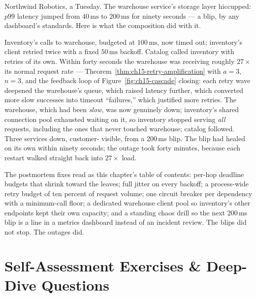 Northwind Robotics, a Tuesday. The warehouse service's storage layer
hiccupped: $p99$ latency jumped from $40\,\mathrm{ms}$ to
$200\,\mathrm{ms}$ for ninety seconds --- a blip, by any dashboard's
standards. Here is what the composition did with it.

Inventory's calls to warehouse, budgeted at $100\,\mathrm{ms}$, now timed
out; inventory's client retried twice with a fixed $50\,\mathrm{ms}$
backoff. Catalog called inventory with retries of its own. Within forty
seconds the warehouse was receiving roughly $27\times$ its normal request
rate --- Theorem~\ref{thm:ch15-retry-amplification} with $a = 3$, $n = 3$,
and the feedback loop of Figure~\ref{fig:ch15-cascade} closing: each retry
wave deepened the warehouse's queue, which raised latency further, which
converted more slow successes into timeout ``failures,'' which justified
more retries. The warehouse, which had been \emph{slow}, was now genuinely
down; inventory's shared connection pool exhausted waiting on it, so
inventory stopped serving \emph{all} requests, including the ones that
never touched warehouse; catalog followed. Three services down, customer-
visible, from a 200\,ms blip. The blip had healed on its own within ninety
seconds; the outage took forty minutes, because each restart walked
straight back into $27\times$ load.

The postmortem fixes read as this chapter's table of contents: per-hop
deadline budgets that shrink toward the leaves; full jitter on every
backoff; a process-wide retry budget of ten percent of request volume; one
circuit breaker per dependency with a minimum-call floor; a dedicated
warehouse client pool so inventory's other endpoints kept their own
capacity; and a standing chaos drill so the next 200\,ms blip is a line in
a metrics dashboard instead of an incident review. The blips did not stop.
The outages did.

\section{Self-Assessment Exercises \& Deep-Dive Questions}
\label{sec:ch15-exercises}

